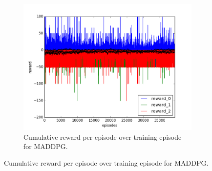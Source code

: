 \begin{figure}[h]
\begin{subfigure}[h]{\figscale\linewidth}
    \includegraphics[trim=10 10 10 10,clip,width=\linewidth]
    {../results/maddpg_2vs1/reward.png}
    \caption{Cumulative reward per episode over training episode for MADDPG.}
    \label{fig:maddpg-2vs1-reward}
  \end{subfigure}


\end{figure}
